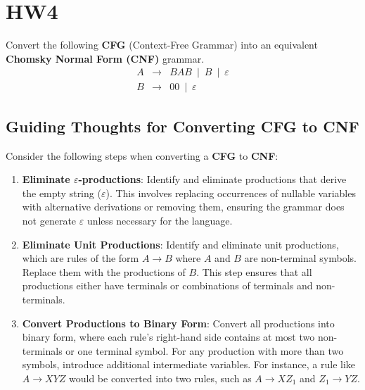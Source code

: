 \documentclass[lettersize,journal]{IEEEtran}
\begin{document}
\section{HW4}
Convert the following \textbf{CFG} (Context-Free Grammar) into an equivalent \textbf{Chomsky Normal Form (CNF)} grammar.
\[
\begin{array}{rcl}
    A & \rightarrow & BAB \ \mid \ B \ \mid \ \varepsilon \\
    B & \rightarrow & 00 \ \mid \ \varepsilon
\end{array}
\]

\subsection*{Guiding Thoughts for Converting CFG to CNF}

\noindent Consider the following steps when converting a \textbf{CFG} to \textbf{CNF}:

\begin{enumerate}[label=\arabic*.] 
    \item \textbf{Eliminate $\varepsilon$-productions}: 
    Identify and eliminate productions that derive the empty string ($\varepsilon$). This involves replacing occurrences of nullable variables with alternative derivations or removing them, ensuring the grammar does not generate $\varepsilon$ unless necessary for the language.
    
    \item \textbf{Eliminate Unit Productions}: 
    Identify and eliminate unit productions, which are rules of the form $A \rightarrow B$ where $A$ and $B$ are non-terminal symbols. Replace them with the productions of $B$. This step ensures that all productions either have terminals or combinations of terminals and non-terminals.

    \item \textbf{Convert Productions to Binary Form}: 
    Convert all productions into binary form, where each rule's right-hand side contains at most two non-terminals or one terminal symbol. For any production with more than two symbols, introduce additional intermediate variables. For instance, a rule like $A \rightarrow XYZ$ would be converted into two rules, such as $A \rightarrow XZ_1$ and $Z_1 \rightarrow YZ$.
\end{enumerate}
\end{document}
